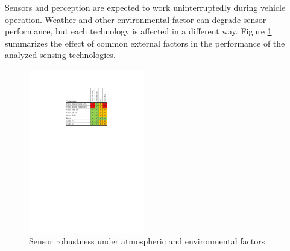 Sensors and perception are expected to work uninterruptedly during vehicle 
operation. Weather and other environmental factor can degrade sensor
performance, but each technology is affected in a different way. 
Figure \ref{fig:sensors-environ} summarizes the effect of common external
factors in the performance of the analyzed sensing technologies.

\begin{figure}[h]
    \centering
    \includegraphics[width=0.45\textwidth]{"img/sensors_atmospheric_conditions"}
    \caption{Sensor robustness under atmospheric and environmental factors}
    \label{fig:sensors-environ}
\end{figure}

